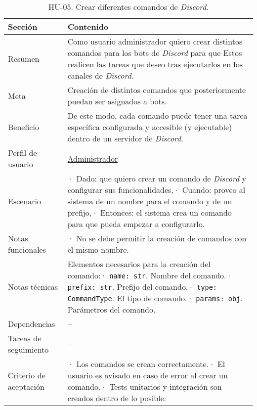 \begin{table}[H]
    \centering
    \def\arraystretch{1.25}
    \begin{adjustbox}{max width=\textwidth}
    \begin{tabularx}{\textwidth}{|l|L|}
    \hline
        \textbf{Sección} & \textbf{Contenido} \\ \hline
    \hline
        Resumen & Como usuario administrador quiero crear distintos comandos para los bots de \textit{Discord} para que Estos realicen las tareas que deseo tras ejecutarlos en los canales de \textit{Discord}. \\ \hline
        Meta & Creación de distintos comandos que posteriormente puedan ser asignados a bots. \\ \hline
        Beneficio & De este modo, cada comando puede tener una tarea específica configurada y accesible (y ejecutable) dentro de un servidor de \textit{Discord}. \\ \hline
        Perfil de usuario & \hyperref[sec:personaAdmin]{Administrador} \\ \hline
        Escenario & · Dado: que quiero crear un comando de \textit{Discord} y configurar sus funcionalidades,\linebreak · Cuando: proveo al sistema de un nombre para el comando y de un prefijo,\linebreak · Entonces: el sistema crea un comando para que pueda empezar a configurarlo. \\ \hline
        Notas funcionales & · No se debe permitir la creación de comandos con el mismo nombre. \\ \hline
        Notas técnicas & Elementos necesarios para la creación del comando:\linebreak · \verb|name: str|. Nombre del comando.\linebreak · \verb|prefix: str|. Prefijo del comando.\linebreak · \verb|type: CommandType|. El tipo de comando.\linebreak · \verb|params: obj|. Parámetros del comando. \\ \hline
        Dependencias & – \\ \hline
        Tareas de seguimiento & – \\ \hline
        Criterio de aceptación & · Los comandos se crean correctamente.\linebreak · El usuario es avisado en caso de error al crear un comando.\linebreak · Tests unitarios y integración son creados dentro de lo posible. \\ \hline
    \end{tabularx}
    \end{adjustbox}
    \caption{HU-05. Crear diferentes comandos de \textit{Discord}.}
\end{table}

